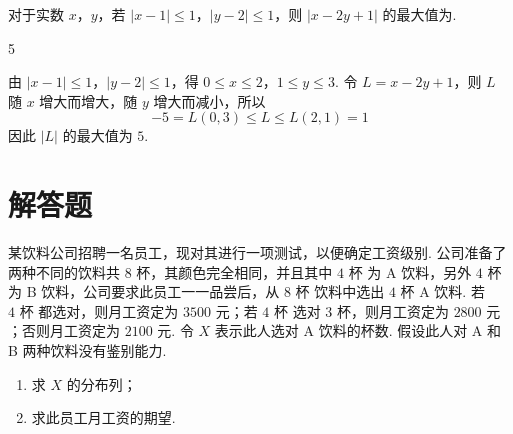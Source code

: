 \reuseproblemnumber
\begin{problem}[B]
对于实数 \(x\)，\(y\)，若 \(|x - 1| \leqslant 1\)，\(|y - 2| \leqslant 1\)，则 \(|x - 2y + 1|\) 的最大值为\fillinblank{}.
\end{problem}

\begin{answer}
5
\end{answer}

\begin{solution}
由 \(|x-1|\leqslant 1\)，\(|y-2|\leqslant 1\)，得
\(0\leqslant x\leqslant 2\)，\(1\leqslant y\leqslant 3\). 令
\(L=x-2y+1\)，则 \(L\) 随 \(x\) 增大而增大，随 \(y\) 增大而减小，所以
\[
-5=L(0,3)\leqslant L\leqslant L(2,1)=1
\]
因此 \(|L|\) 的最大值为 \(5\).
\end{solution}

\section{解答题}

\begin{problem}
某饮料公司招聘一名员工，现对其进行一项测试，以便确定工资级别. 公司准备了两种不同的饮料共 \(8\text{ 杯}\)，其颜色完全相同，并且其中 \(4\text{ 杯}\) 为 A 饮料，另外 \(4\text{ 杯}\) 为 B 饮料，公司要求此员工一一品尝后，从 \(8\text{ 杯}\) 饮料中选出 \(4\text{ 杯}\) A 饮料. 若 \(4\text{ 杯}\) 都选对，则月工资定为 \(3500\text{ 元}\)；若 \(4\text{ 杯}\) 选对 \(3\text{ 杯}\)，则月工资定为 \(2800\text{ 元}\)；否则月工资定为 \(2100\text{ 元}\). 令 \(X\) 表示此人选对 A 饮料的杯数. 假设此人对 A 和 B 两种饮料没有鉴别能力.

\begin{enumerate}
\item 求 \(X\) 的分布列；
\item 求此员工月工资的期望.
\end{enumerate}
\end{problem}

